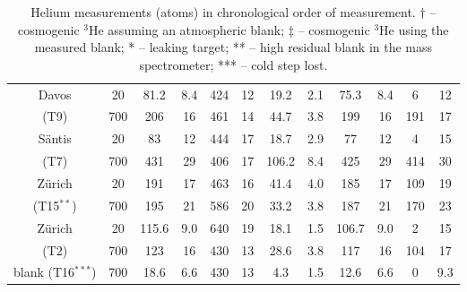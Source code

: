 \documentclass{article}
\begin{document}
\begin{table}[htbp]
\begin{tabular}{cccccccccccc}
\hline
Davos &    20 &    81.2 &     8.4 &  424 &   12 &  19.2 &   2.1 &  75.3 &   8.4 &   6 &  12 \\
(T9)         &   700 &   206 &    16 &  461 &   14 &  44.7 &   3.8 & 199 &  16 & 191 &  17 \\
\hline
S\"{a}ntis &    20 &    83 &    12 &  444 &   17 &  18.7 &   2.9 &  77 &  12 &   4 &  15 \\
(T7)        &   700 &   431 &    29 &  406 &   17 & 106.2 &   8.4 & 425 &  29 & 414 &  30 \\
\hline
Z\"{u}rich &    20 &   191 &    17 &  463 &   16 &  41.4 &   4.0 & 185 &  17 & 109 &  19 \\
(T15$^{**}$)         &   700 &   195 &    21 &  586 &   20 &  33.2 &   3.8 & 187 &  21 & 170 &  23 \\
\hline
Z\"{u}rich &    20 &   115.6 &     9.0 &  640 &   19 &  18.1 &   1.5 & 106.7 &   9.0 &   2 &  15 \\
(T2)          &   700 &   123 &    16 &  430 &   13 &  28.6 &   3.8 & 117 &  16 & 104 &  17 \\
\hline
blank (T16$^{***}$) &   700 &    18.6 &     6.6 &  430 &   13 &   4.3 &   1.5 &  12.6 &   6.6 &     0 &   9.3 \\
\end{tabular}
\caption{Helium measurements (atoms) in chronological order of measurement. 
$\dagger$ -- cosmogenic $^3$He assuming an atmospheric blank; 
$\ddagger$ -- cosmogenic $^3$He using the measured blank; * -- leaking target; 
** -- high residual blank in the mass spectrometer; *** -- cold step lost.}
\label{tab:3HeData}
\end{table}
\end{document}
